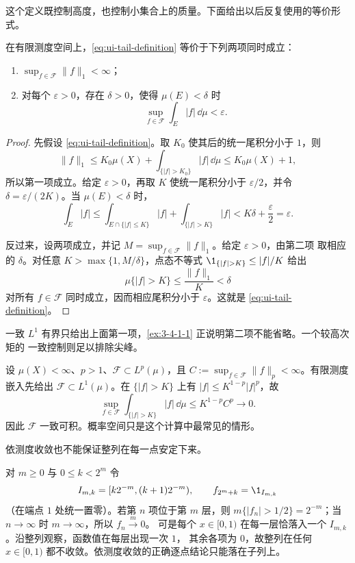 这个定义既控制高度，也控制小集合上的质量。下面给出以后反复使用的等价形式。

\begin{lemma}[一致可积的两种口径]\label{lemma:3-4-1-ui-equivalence}
在有限测度空间上，\eqref{eq:ui-tail-definition} 等价于下列两项同时成立：
\begin{enumerate}
  \item $\sup_{f\in\mathcal F}\|f\|_1<\infty$；
  \item 对每个 $\varepsilon>0$，存在 $\delta>0$，使得 $\mu(E)<\delta$ 时
  \[
    \sup_{f\in\mathcal F}\int_E|f|\,\dd\mu<\varepsilon.
  \]
\end{enumerate}
\end{lemma}

\begin{proof}
先假设 \eqref{eq:ui-tail-definition}。取 $K_0$ 使其后的统一尾积分小于 $1$，则
\[
  \|f\|_1
  \le K_0\mu(X)+\int_{\{|f|>K_0\}}|f|\,\dd\mu
  \le K_0\mu(X)+1,
\]
所以第一项成立。给定 $\varepsilon>0$，再取 $K$ 使统一尾积分小于 $\varepsilon/2$，并令
$\delta=\varepsilon/(2K)$。当 $\mu(E)<\delta$ 时，
\[
 \int_E|f|
 \le \int_{E\cap\{|f|\le K\}}|f|+
      \int_{\{|f|>K\}}|f|
 <K\delta+\frac\varepsilon2=\varepsilon.
\]

反过来，设两项成立，并记 $M=\sup_{f\in\mathcal F}\|f\|_1$。给定 $\varepsilon>0$，由第二项
取相应的 $\delta$。对任意 $K>\max\{1,M/\delta\}$，点态不等式
$\1_{\{|f|>K\}}\le |f|/K$ 给出
\[
  \mu\{|f|>K\}\le \frac{\|f\|_1}{K}<\delta
\]
对所有 $f\in\mathcal F$ 同时成立，因而相应尾积分小于 $\varepsilon$。这就是
\eqref{eq:ui-tail-definition}。
\end{proof}

一致 $L^1$ 有界只给出上面第一项，\cref{ex:3-4-1-1} 正说明第二项不能省略。一个较高次矩的
一致控制则足以排除尖峰。

\begin{example}[$L^p$ 有界族一致可积]\label{ex:3-4-1-2}
设 $\mu(X)<\infty$、$p>1$、$\mathcal F\subset L^p(\mu)$，且
$C:=\sup_{f\in\mathcal F}\|f\|_p<\infty$。有限测度嵌入先给出
$\mathcal F\subset L^1(\mu)$。在 $\{|f|>K\}$ 上有
$|f|\le K^{1-p}|f|^p$，故
\[
 \sup_{f\in\mathcal F}\int_{\{|f|>K\}}|f|\,\dd\mu
 \le K^{1-p}C^p\longrightarrow0.
\]
因此 $\mathcal F$ 一致可积。概率空间只是这个计算中最常见的情形。
\end{example}

依测度收敛也不能保证整列在每一点安定下来。

\begin{example}[打字机序列]\label{ex:3-4-1-3}
对 $m\ge0$ 与 $0\le k<2^m$ 令
\[
 I_{m,k}=[k2^{-m},(k+1)2^{-m}),\qquad f_{2^m+k}=\1_{I_{m,k}}
\]
（在端点 $1$ 处统一置零）。若第 $n$ 项位于第 $m$ 层，则
$m\{|f_n|>1/2\}=2^{-m}$；当 $n\to\infty$ 时 $m\to\infty$，所以 $f_n\xrightarrow{m}0$。
可是每个 $x\in[0,1)$ 在每一层恰落入一个 $I_{m,k}$。沿整列观察，函数值在每层出现一次 $1$，
其余各项为 $0$，故整列在任何 $x\in[0,1)$ 都不收敛。依测度收敛的正确逐点结论只能落在子列上。
\end{example}

